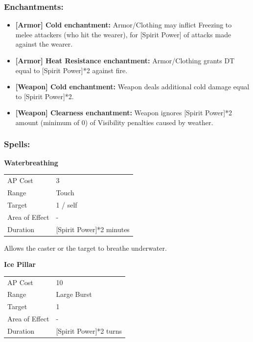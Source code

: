 \documentclass[11pt,a4paper,twocolumn]{book}
\begin{document}
\medskip

\subsubsection*{Enchantments:}

\begin{itemize}
	\item \textbf{ [Armor] Cold enchantment:} Armor/Clothing may inflict Freezing to melee attackers (who hit the wearer), for [Spirit Power] of attacks made against the wearer.
	\item \textbf{ [Armor] Heat Resistance enchantment:} Armor/Clothing grants DT equal to [Spirit Power]*2 against fire.
	\item \textbf{ [Weapon] Cold enchantment:} Weapon deals additional cold damage equal to [Spirit Power]*2.
	\item \textbf{ [Weapon] Clearness enchantment:} Weapon ignores [Spirit Power]*2 amount (minimum of 0) of Visibility penalties caused by weather.
\end{itemize}

\subsubsection*{Spells:}

\smallskip
\noindent
\textbf{Waterbreathing}

\smallskip
{
	\begin{tabu} to 70mm{| X[l,4] | X[l,7] |}
		\hline
        AP Cost	      	& 3 						\\
        Range     		& Touch				\\
        Target      	& 1 / self		\\
        Area of Effect  & -  	 			\\
        Duration     	& [Spirit Power]*2 minutes		\\ \hline
	\end{tabu}
		
}
\smallskip

Allows the caster or the target to breathe underwater.

\bigskip
\noindent
\textbf{Ice Pillar}

\smallskip
{
	\begin{tabu} to 70mm{| X[l,4] | X[l,7] |}
		\hline
        AP Cost	      	& 10 						\\
        Range     		& Large Burst				\\
        Target      	& 1		\\
        Area of Effect  & -  	 			\\
        Duration     	& [Spirit Power]*2 turns		\\ \hline
	\end{tabu}
		
}
\smallskip
\end{document}
